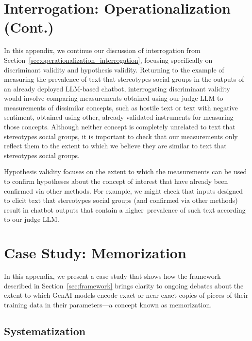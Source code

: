 \documentclass{article}
\begin{document}
\section{Interrogation: Operationalization (Cont.)}
\label{sec:operationalization_interrogation_cont}

In this appendix, we continue our discussion of interrogation from Section~\ref{sec:operationalization_interrogation}, focusing specifically on discriminant validity and hypothesis validity. Returning to the example of measuring the prevalence
of text that stereotypes social groups in the outputs of
an already deployed LLM-based chatbot, interrogating discriminant validity would involve comparing measurements obtained using our judge LLM to measurements of dissimilar concepts, such as hostile text or text with negative sentiment, obtained using other, already validated instruments for measuring those concepts. Although neither concept is completely unrelated to text that stereotypes social groups, it is important to check that our measurements only reflect them to the extent to which we believe they are similar to text that stereotypes social groups.

Hypothesis validity focuses on the extent to which the measurements can be used to confirm hypotheses about the concept of interest that have already been confirmed via other methods. For example, we might check that inputs designed to elicit text that stereotypes social groups (and confirmed via other methods) result in chatbot outputs that contain a higher~prevalence of such text according to our judge LLM.

\section{Case Study: Memorization}
\label{sec:memorization}

In this appendix, we present a case study that shows how the framework described in Section~\ref{sec:framework} brings clarity to ongoing debates about the extent to which GenAI models encode exact or near-exact copies of pieces of their training data in their parameters---a concept known as memorization.

\subsection{Systematization}
\end{document}
